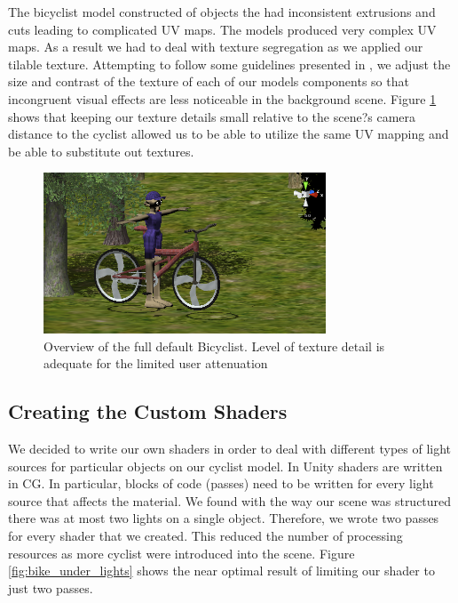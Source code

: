 \documentclass{scrartcl}
\begin{document}
The bicyclist model constructed of objects the had inconsistent extrusions and cuts leading to complicated UV maps.  The models produced very complex UV maps.  As a result we had to deal with texture segregation as we applied our tilable texture.  Attempting to follow some guidelines presented in \citep{spatfrequency}, we adjust the size and contrast of the texture of each of our models components so that incongruent visual effects are less noticeable in the background scene.  Figure \ref{fig:fullbike} shows that keeping our texture details small relative to the scene?s camera distance to the cyclist allowed us to be able to utilize the same UV mapping and be able to substitute out textures.  

\begin{figure}[h]
    \centering
    \includegraphics[width=0.75\textwidth]{bike_fullshot.png}
    \caption{Overview of the full default Bicyclist.  Level of texture detail is adequate for the limited user attenuation}
    \label{fig:fullbike}
\end{figure}
		
    \subsection{Creating the Custom Shaders} 
        
        We decided to write our own shaders in order to deal with different types of light sources for particular objects on our cyclist model.   In Unity shaders are written in CG.  	In particular, blocks of code (passes) need to be written for every light source that affects the material. We found with the way our scene was structured there was at 	most two lights on a single object.  Therefore, we wrote two passes for every shader that we created.  This reduced the number of processing resources as more cyclist 	were introduced into the scene.  Figure \ref{fig:bike_under_lights} shows the near optimal result of limiting our shader to just two passes.
\end{document}
